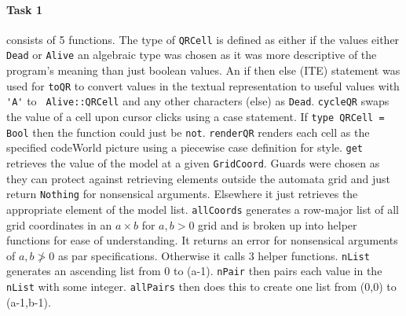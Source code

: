 \documentclass[11pt]{article}
\begin{document}
\paragraph{Task 1} consists of 5 functions. The type of \verb|QRCell| is defined as either if the values either \verb|Dead| or \verb|Alive| an algebraic type was chosen as it was more descriptive of the program's meaning than just boolean values. An if then else (ITE) statement was used for \verb|toQR| to convert values in the textual representation to useful values with \verb|'A'| to \verb| Alive::QRCell| and any other characters (else) as \verb|Dead|.  \verb|cycleQR| swaps the value of a cell upon cursor clicks using a case statement.  If \verb|type QRCell = Bool| then the function could just be \verb|not|. \verb|renderQR| renders each cell as the specified codeWorld picture using a piecewise case definition for style.  \verb|get| retrieves the value of the model at a given \verb|GridCoord|. Guards were chosen as they can protect against retrieving elements outside the automata grid and just return \verb|Nothing| for nonsensical arguments. Elsewhere it just retrieves the appropriate element of the model list. \verb|allCoords| generates a row-major list of all grid coordinates in an $a\times b$ for $a,b>0$ grid and is broken up into helper functions for ease of understanding.  It returns an error for nonsensical arguments of $a,b\not>0$ as par specifications. Otherwise it calls 3 helper functions. \verb|nList| generates an ascending list from 0 to (a-1). \verb|nPair| then pairs each value in the \verb|nList| with some integer. \verb|allPairs| then does this to create one list from (0,0) to (a-1,b-1). 
\end{document}
